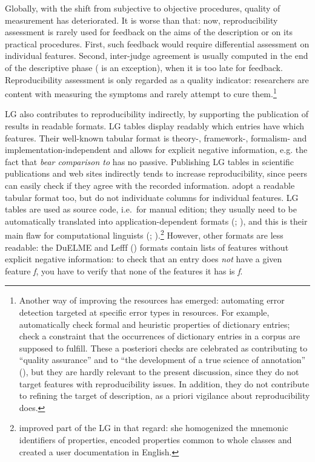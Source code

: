 \documentclass[output=paper]{langsci/langscibook}
\begin{document}
Globally, with the shift from subjective to objective procedures, quality of measurement has deteriorated. It is worse than that: now, reproducibility assessment is rarely used for feedback on the aims of the description or on its practical procedures. First, such feedback would require differential assessment on individual features. Second, inter-judge agreement is usually computed in the end of the descriptive phase (\citep[803]{Meyers} is an exception), when it is too late for feedback. Reproducibility assessment is only regarded as a quality indicator: researchers are content with measuring the symptoms and rarely attempt to cure them.\footnote{ Another way of improving the resources has emerged: automating error detection targeted at specific error types in resources. For example, \citet{Meyers} automatically check formal and heuristic properties of dictionary entries; \citet{Cohen}  check a constraint that the occurrences of dictionary entries in a corpus are supposed to fulfill. These a posteriori checks are celebrated as contributing to “quality assurance” and to “the development of a true science of annotation” (\citealt[82]{Cohen}), but they are hardly relevant to the present discussion, since they do not target features with reproducibility issues. In addition, they do not contribute to refining the target of description, as a priori vigilance about reproducibility does.}

LG also contributes to reproducibility indirectly, by supporting the publication of results in readable formats. LG tables display readably which entries have which features. Their well-known tabular format is theory-, framework-, formalism- and implementation-independent and allows for explicit negative information, e.g. the fact that \textit{bear comparison to} has no passive. Publishing LG tables in scientific publications and web sites indirectly tends to increase reproducibility, since peers can easily check if they agree with the recorded information.  \citet{Kaalep2008} adopt a readable tabular format too, but do not individuate columns for individual features. LG tables are used as source code, i.e.~for manual edition; they usually need to be automatically translated into application-dependent formats (\citealt{Tolonea}; \citealt{Constanta}), and this is their main flaw for computational linguists (\citealt{Hathout1998}; \citealt{Gardent2005}).\footnote{ \citet{Tolone2011} improved part of the LG in that regard: she homogenized the mnemonic identifiers of properties, encoded properties common to whole classes and created a user documentation in English.} However, other formats are less readable: the DuELME \cite[34–36]{Gregoire2010}  and Lefff (\citealt{Tolonea}) formats contain lists of features without explicit negative information: to check that an entry does \textit{not} have a given feature \textit{f}, you have to verify that none of the features it has is \textit{f}.
\end{document}
